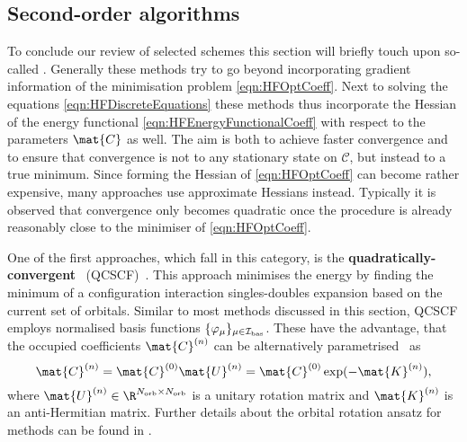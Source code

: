 \subsection{Second-order \SCF algorithms}
\label{sec:SOSCF}

To conclude our review of selected \SCF schemes
this section will briefly touch upon so-called .
Generally these methods try to go beyond incorporating
gradient information of the \HF minimisation problem \eqref{eqn:HFOptCoeff}.
Next to solving the \HF equations \eqref{eqn:HFDiscreteEquations}
these methods thus incorporate the  Hessian
of the energy functional \eqref{eqn:HFEnergyFunctionalCoeff}
with respect to the parameters $\mat{C}$ as well.
The aim is both to achieve faster convergence
and to ensure that convergence is not to any stationary state on $\mathcal{C}$,
but instead to a true \SCF minimum.
Since forming the Hessian of \eqref{eqn:HFOptCoeff} can become rather expensive,
many approaches use approximate Hessians instead.
Typically it is observed
that convergence only becomes quadratic
once the \SCF procedure is already reasonably
close to the minimiser of \eqref{eqn:HFOptCoeff}.

One of the first approaches, which fall in this category,
is the \textbf{quadratically-convergent \SCF}~(QCSCF)~\cite{Bacskay1981}.
This approach minimises the \SCF energy by finding the minimum of a
configuration interaction singles-doubles expansion
based on the current set of \SCF orbitals.
Similar to most methods discussed in this section,
QCSCF employs normalised basis functions $\{\varphi_\mu\}_{\mu\in\mathcal{I}_\text{bas}}$.
These have the advantage, that the occupied \SCF coefficients $\mat{C}^{(n)}$
can be alternatively parametrised~\cite{Helgaker2013} as
\[ \mat{C}^{(n)} = \mat{C}^{(0)} \mat{U}^{(n)} = \mat{C}^{(0)} \exp(-\mat{K}^{(n)}), \]
where $\mat{U}^{(n)} \in \R^{\Norb \times \Norb}$ is a unitary rotation matrix
and $\mat{K}^{(n)}$ is an anti-Hermitian matrix.
Further details about the orbital rotation ansatz for \SCF methods
can be found in \cite{Helgaker2013}.

